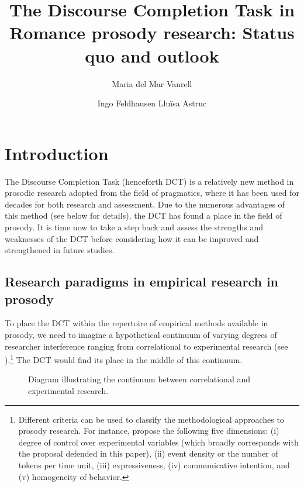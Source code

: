 \documentclass[output=paper]{LSP/langsci}
\author{Maria del Mar Vanrell\affiliation{Universitat de les Illes Balears}\and
Ingo Feldhausen\affiliation{Goethe-Universität Frankfurt am Main}\lastand
Lluïsa Astruc\affiliation{The Open University}
}
\title{The Discourse Completion Task in Romance prosody research: Status quo and outlook}
\begin{document}
\label{chap:van}\label{ch:6}

\section{Introduction}
\label{sec:van:1}
The Discourse Completion Task (henceforth DCT) is a relatively new method in prosodic research adopted from the field of pragmatics, where it has been used for decades for both research and assessment. Due to the numerous advantages of this method (see  below for details), the DCT has found a place in the field of prosody. It is time now to take a step back and assess the strengths and weaknesses of the DCT before considering how it can be improved and strengthened in future studies. 

\subsection{Research paradigms in empirical research in prosody}
\label{sec:van:1.1}
To place the DCT within the repertoire of empirical methods available in prosody, we need to imagine a hypothetical continuum of varying degrees of researcher interference ranging from correlational to experimental research (see ).\footnote{Different criteria can be used to classify the methodological approaches to prosody research. For instance, \citet{Niebuhr2015} propose the following five dimensions: (i) degree of control over experimental variables (which broadly corresponds with the proposal defended in this paper), (ii) event density or the number of tokens per time unit, (iii) expressiveness, (iv) communicative intention, and (v) homogeneity of behavior.} The DCT would find its place in the middle of this continuum. 
\begin{figure}
\caption{Diagram illustrating the continuum between correlational and experimental research.}
\label{fig:van:1} 
\end{figure}
\end{document}
